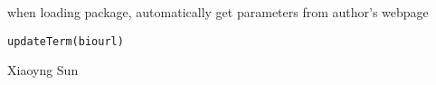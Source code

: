 \begin{Description}\relax
when loading package, automatically get parameters from author's webpage
\end{Description}
\begin{Usage}
\begin{verbatim}
updateTerm(biourl)
\end{verbatim}
\end{Usage}
\begin{Arguments}
\begin{ldescription}
\item[\code{biourl}] 
\end{ldescription}
\end{Arguments}
\begin{Author}\relax
Xiaoyng Sun
\end{Author}

